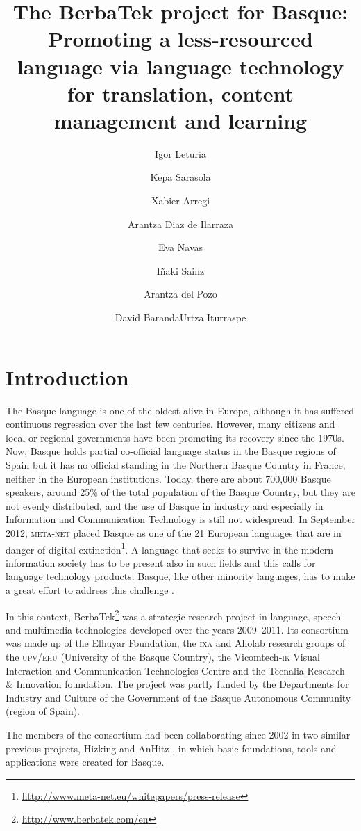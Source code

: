 \documentclass[output=paper]{LSP/langsci}
\author{Igor Leturia\affiliation{Elhuyar Foundation}\and Kepa Sarasola\and Xabier Arregi\and Arantza Diaz de Ilarraza\affiliation{\textsc{ixa} Group, University of the Basque Country}\and Eva Navas\and Iñaki Sainz\affiliation{Aholab Group, University of the Basque Country}\and Arantza del Pozo\affiliation{Vicomtech-\textsc{ik}\oldstylenums{4}}\and David Baranda\lastand Urtza Iturraspe\affiliation{Tecnalia}}
\title{The BerbaTek project for Basque: Promoting a less-resourced language via language technology for translation, content management and learning}
\begin{document}
 


\section{Introduction}\label{sec:leturia:1}

The Basque language is one of the oldest alive in Europe, although it has suffered continuous regression over the last few centuries. However, many citizens and local or regional governments have been promoting its recovery since the 1970s. Now, Basque holds partial co-official language status in the Basque regions of Spain but it has no official standing in the Northern Basque Country in France, neither in the European institutions. Today, there are about 700,000 Basque speakers, around 25\% of the total population of the Basque Country, but they are not evenly distributed, and the use of Basque in industry and especially in Information and Communication Technology is still not widespread. In September 2012, \textsc{meta-net} placed Basque as one of the 21 European languages that are in danger of digital extinction\footnote{\url{http://www.meta-net.eu/whitepapers/press-release}}. A language that seeks to survive in the modern information society has to be present also in such fields and this calls for language technology products. Basque, like other minority languages, has to make a great effort to address this challenge \citep{WilliamsEtAl2001}. 

In this context, BerbaTek\footnote{\url{http://www.berbatek.com/en}} was a strategic research project in language, speech and multimedia technologies developed over the years 2009--2011. Its consortium was made up of the Elhuyar Foundation, the \textsc{ixa} and Aholab research groups of the \textsc{upv\slash ehu} (University of the Basque Country), the Vicomtech-\textsc{ik} Visual Interaction and Communication Technologies Centre and the Tecnalia Research \& Innovation foundation. The project was partly funded by the Departments for Industry and Culture of the Government of the Basque Autonomous Community (region of Spain).

The members of the consortium had been collaborating since 2002 in two similar previous projects, Hizking \citep{DiazEtAl2003} and AnHitz \citep{ArrietaEtAl2008}, in which basic foundations, tools and applications were created for Basque.
\end{document}

